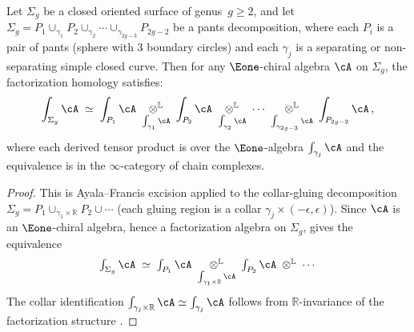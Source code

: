 \begin{proposition}
\label{prop:pants-excision}
Let $\Sigma_g$ be a closed oriented surface of genus~$g \geq 2$,
and let $\Sigma_g = P_1 \cup_{\gamma_1} P_2 \cup_{\gamma_2}
\cdots \cup_{\gamma_{2g-3}} P_{2g-2}$ be a pants decomposition,
where each $P_i$ is a pair of pants (sphere with $3$ boundary
circles) and each $\gamma_j$ is a separating or non-separating
simple closed curve. Then for any $\Eone$-chiral algebra $\cA$ on
$\Sigma_g$, the factorization homology satisfies:
\begin{equation}\label{eq:fh-excision}
\int_{\Sigma_g} \cA
\;\simeq\;
\int_{P_1} \cA
\;\underset{\int_{\gamma_1}\cA}{\otimes^{\mathbb{L}}}\;
\int_{P_2} \cA
\;\underset{\int_{\gamma_2}\cA}{\otimes^{\mathbb{L}}}\;
\cdots
\;\underset{\int_{\gamma_{2g-3}}\cA}{\otimes^{\mathbb{L}}}\;
\int_{P_{2g-2}} \cA\,,
\end{equation}
where each derived tensor product is over the $\Eone$-algebra
$\int_{\gamma_j}\cA$ and the equivalence is in the
$\infty$-category of chain complexes.
\end{proposition}

\begin{proof}
This is Ayala--Francis excision \cite{AF15} applied to the
collar-gluing decomposition $\Sigma_g = P_1 \cup_{\gamma_1 \times
\mathbb{R}} P_2 \cup \cdots$ (each gluing region is a collar
$\gamma_j \times (-\epsilon, \epsilon)$). Since $\cA$ is an
$\Eone$-chiral algebra, hence a factorization algebra on $\Sigma_g$,
\cite[Theorem~3.24]{AF15} gives the equivalence
\[
\textstyle\int_{\Sigma_g}\cA \;\simeq\;
\textstyle\int_{P_1}\cA
\;\underset{\int_{\gamma_1 \times \mathbb{R}}\cA}{\otimes^{\mathbb{L}}}\;
\textstyle\int_{P_2}\cA
\;\underset{}{\otimes^{\mathbb{L}}}\; \cdots
\]
The collar identification
$\int_{\gamma_j \times \mathbb{R}}\cA \simeq \int_{\gamma_j}\cA$
follows from $\mathbb{R}$-invariance of the factorization structure
\cite[Proposition~3.10]{AF15}.
\end{proof}

